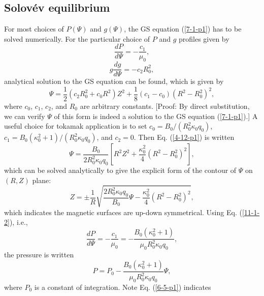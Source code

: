 \documentclass{llncs}
\begin{document}
\subsection{Solov{\'e}v equilibrium}\label{20-4-8-p1}

For most choices of $P (\Psi)$ and $g (\Psi)$, the GS equation (\ref{7-1-p1})
has to be solved numerically. For the particular choice of $P$ and $g$
profiles given by
\begin{equation}
  \label{11-1-2} \frac{d P}{d \Psi} = - \frac{c_1}{\mu_0},
\end{equation}
\begin{equation}
  \label{3-15-a1} g \frac{d g}{d \Psi} = - c_2 R_0^2,
\end{equation}
analytical solution to the GS equation can be found, which is given
by{\cite{jardin2010}}
\begin{equation}
  \label{4-12-p1} \Psi = \frac{1}{2} (c_2 R_0^2 + c_0 R^2) Z^2 + \frac{1}{8}
  (c_1 - c_0) (R^2 - R_0^2)^2,
\end{equation}
where $c_0$, $c_1$, $c_2$, and $R_0$ are arbitrary constants. [Proof: By
direct substitution, we can verify $\Psi$ of this form is indeed a solution to
the GS equation (\ref{7-1-p1}).] A useful choice for tokamak application is to
set $c_0 = B_0 / (R_0^2 \kappa_0 q_0)$, $c_1 = B_0 (\kappa_0^2 + 1) / (R_0^2
\kappa_0 q_0)$, and $c_2 = 0$. Then Eq. (\ref{4-12-p1}) is written
\begin{equation}
  \label{6-5-p1} \Psi = \frac{B_0}{2 R_0^2 \kappa_0 q_0} \left[ R^2 Z^2 +
  \frac{\kappa_0^2}{4} (R^2 - R_0^2)^2 \right],
\end{equation}
which can be solved analytically to give the explicit form of the contour of
$\Psi$ on $(R, Z)$ plane:
\begin{equation}
  \label{9-9-1} Z = \pm \frac{1}{R} \sqrt{\frac{2 R_0^2 \kappa_0 q_0}{B_0}
  \Psi - \frac{\kappa_0^2}{4} (R^2 - R_0^2)^2},
\end{equation}
which indicates the magnetic surfaces are up-down symmetrical. Using Eq.
(\ref{11-1-2}), i.e.,
\begin{equation}
  \frac{d P}{d \Psi} = - \frac{c_1}{\mu_0} = - \frac{B_0 (\kappa_0^2 +
  1)}{\mu_0 R_0^2 \kappa_0 q_0},
\end{equation}
the pressure is written
\begin{equation}
  \label{6-5-1} P = P_0 - \frac{B_0 (\kappa_0^2 + 1)}{\mu_0 R_0^2 \kappa_0
  q_0} \Psi,
\end{equation}
where $P_0$ is a constant of integration. Note Eq. (\ref{6-5-p1}) indicates
\end{document}

